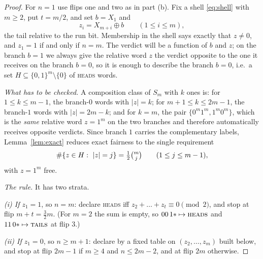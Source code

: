\documentclass[11pt]{article}
\theoremstyle{remark}
\newcommand{\head}{\textnormal{\textsc{heads}}}
\newcommand{\tail}{\textnormal{\textsc{tails}}}
\begin{document}
\begin{proof}
For $n=1$ use flips one and two as in part (b). Fix a shell
\eqref{eq:shell} with $m\ge2$, put $t=m/2$, and set $b=X_1$ and
\[
z_i=X_{m+i}\oplus b\qquad(1\le i\le m),
\]
the tail relative to the run bit. Membership in the shell says exactly that
$z\ne0$, and $z_1=1$ if and only if $n=m$. The verdict will be a function of
$b$ and $z$; on the branch $b=1$ we always give the relative word $z$ the
verdict opposite to the one it receives on the branch $b=0$, so it is enough
to describe the branch $b=0$, i.e.\ a set $H\subseteq\{0,1\}^m\setminus\{0\}$
of \head{} words.

\emph{What has to be checked.} A composition class of $S_m$ with $k$ ones is:
for $1\le k\le m-1$, the branch-$0$ words with $|z|=k$; for
$m+1\le k\le 2m-1$, the branch-$1$ words with $|z|=2m-k$; and for $k=m$, the
pair $\{0^m1^m,1^m0^m\}$, which is the \emph{same} relative word $z=1^m$ on
the two branches and therefore automatically receives opposite verdicts.
Since branch $1$ carries the complementary labels, Lemma~\ref{lem:exact}
reduces exact fairness to the single requirement
\begin{equation}\label{eq:layer}
\#\{z\in H:\ |z|=j\}=\tfrac12\tbinom mj \qquad (1\le j\le m-1),
\end{equation}
with $z=1^m$ free.

\emph{The rule.} It has two strata.

\emph{(i) If $z_1=1$}, so $n=m$: declare \head{} iff
$z_2+\dots+z_t\equiv0\pmod2$, and stop at flip $m+t=\tfrac32m$. (For $m=2$
the sum is empty, so $00\,1{*}\mapsto\head$ and $11\,0{*}\mapsto\tail$ at
flip $3$.)

\emph{(ii) If $z_1=0$}, so $n\ge m+1$: declare by a fixed table on
$(z_2,\dots,z_m)$ built below, and stop at flip $2m-1$ if $m\ge4$ and
$n\le 2m-2$, and at flip $2m$ otherwise.


\end{proof}
\end{document}
